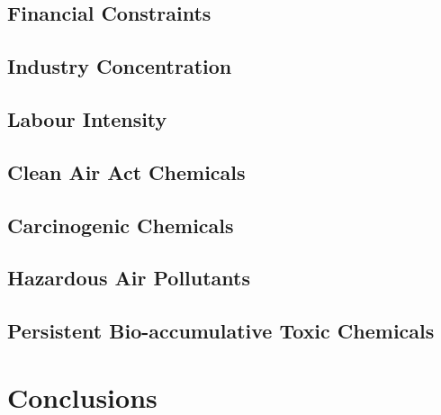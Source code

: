 \documentclass[12pt, english]{article}
\begin{document}
    \subsection{Financial Constraints}\label{subsec:financial-constraints}

    \subsection{Industry Concentration}\label{subsec:industry-concentration}

    \subsection{Labour Intensity}\label{subsec:labour-intensity}

    \subsection{Clean Air Act Chemicals}\label{subsec:clean-air-act-chemicals}

    \subsection{Carcinogenic Chemicals}\label{subsec:carcinogenic-chemicals}

    \subsection{Hazardous Air Pollutants}\label{subsec:hazardous-air-pollutants}

    \subsection{Persistent Bio-accumulative Toxic Chemicals}\label{subsec:persistent-bioaccumulative-toxic-chemicals}


    \section{Conclusions}\label{sec:conclusions}

    \newpage
\end{document}
